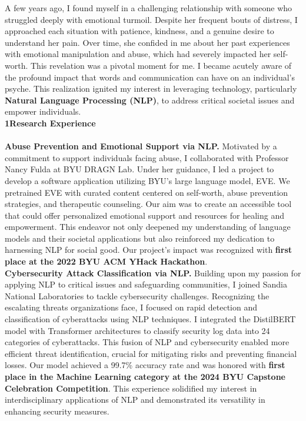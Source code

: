 \documentclass{article}
\begin{document}
A few years ago, I found myself in a challenging relationship with someone who struggled deeply with emotional turmoil. Despite her frequent bouts of distress, I approached each situation with patience, kindness, and a genuine desire to understand her pain. Over time, she confided in me about her past experiences with emotional manipulation and abuse, which had severely impacted her self-worth. This revelation was a pivotal moment for me. I became acutely aware of the profound impact that words and communication can have on an individual's psyche. This realization ignited my interest in leveraging technology, particularly \textbf{Natural Language Processing (NLP)}, to address critical societal issues and empower individuals.
\\

\Large\textbf{1\hspace{1em}Research Experience}\normalsize
\\
\\
\textbf{Abuse Prevention and Emotional Support via NLP.} Motivated by a commitment to support individuals facing abuse, I collaborated with Professor Nancy Fulda at BYU DRAGN Lab. Under her guidance, I led a project to develop a software application utilizing BYU's large language model, EVE. We pretrained EVE with curated content centered on self-worth, abuse prevention strategies, and therapeutic counseling. Our aim was to create an accessible tool that could offer personalized emotional support and resources for healing and empowerment. This endeavor not only deepened my understanding of language models and their societal applications but also reinforced my dedication to harnessing NLP for social good. Our project's impact was recognized with \textbf{first place at the 2022 BYU ACM YHack Hackathon}\cite{byuacm2022}.
\\

\textbf{Cybersecurity Attack Classification via NLP.} Building upon my passion for applying NLP to critical issues and safeguarding communities, I joined Sandia National Laboratories to tackle cybersecurity challenges. Recognizing the escalating threats organizations face, I focused on rapid detection and classification of cyberattacks using NLP techniques. I integrated the DistilBERT model with Transformer architectures to classify security log data into 24 categories of cyberattacks. This fusion of NLP and cybersecurity enabled more efficient threat identification, crucial for mitigating risks and preventing financial losses. Our model achieved a 99.7\% accuracy rate and was honored with \textbf{first place in the Machine Learning category at the 2024 BYU Capstone Celebration Competition}\cite{cybersecurity}. This experience solidified my interest in interdisciplinary applications of NLP and demonstrated its versatility in enhancing security measures.
\\
\end{document}
